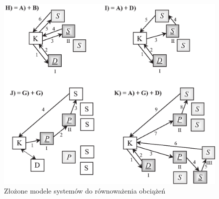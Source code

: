 \begin{figure}[h]
\centering
\includegraphics[width=4.9in]{./rysunki/complex_models.eps}
\caption{Złożone modele systemów do równoważenia obciążeń}
\label{complex_modele}
\end{figure}

